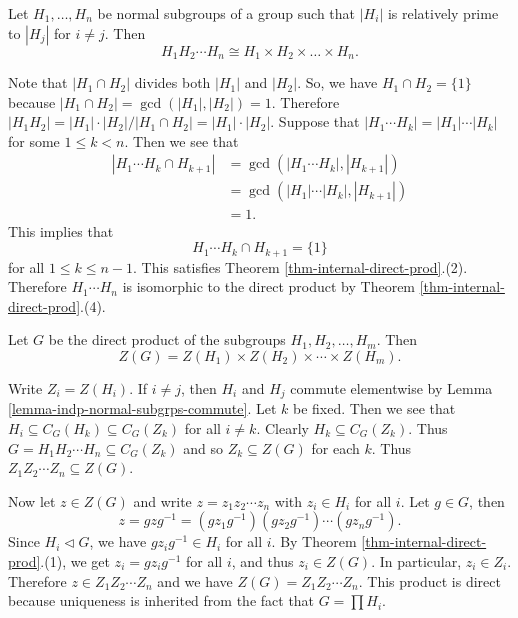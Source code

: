 \begin{corollary} \label{cor-direct-product-isom-to-product-subgrps}
	Let $H_1, \dots, H_n$ be normal subgroups of a group such that $|H_i|$ is relatively prime to $|H_j|$ for $i \neq j$. Then \begin{equation*}
		H_1H_2 \cdots H_n \cong H_1 \times H_2 \times \dots \times H_n.
	\end{equation*} 
\end{corollary}
\begin{sketch}
	Note that $|H_1 \cap H_2|$ divides both $|H_1|$ and $|H_2|$. So, we have $H_1 \cap H_2 = \{1\}$ because $|H_1 \cap H_2| = \gcd(|H_1|, |H_2|) = 1$. Therefore $|H_1 H_2| =|H_1| \cdot |H_2|/|H_1 \cap H_2| =   |H_1| \cdot |H_2|$. Suppose that $|H_1 \cdots H_{k}| = |H_1| \cdots |H_{k}|$ for some $1\leq k< n$. Then we see that 
	\begin{align*}
		|H_1 \cdots H_{k} \cap H_{k+1}| &= \gcd(|H_1 \cdots H_{k}| , |H_{k+1}|) 
		\\
		&= \gcd(|H_1| \cdots |H_{k}| , |H_{k+1}|)
		\\
		&= 1. 
	\end{align*}
	This implies that 
	\begin{equation*}
		H_1 \cdots H_{k} \cap H_{k+1} = \{1\}
	\end{equation*}
	for all $1\leq k\leq n-1$. This satisfies Theorem \ref{thm-internal-direct-prod}.(2). Therefore $H_1 \cdots H_n$ is isomorphic to the direct product by Theorem \ref{thm-internal-direct-prod}.(4).
\end{sketch}
\begin{corollary} \label{cor-center-of-direct-product}
	Let $G$ be the direct product of the subgroups $H_1, H_2, \dots, H_m$. Then 
	\begin{equation*}
		Z(G) = Z(H_1) \times Z(H_2) \times \cdots \times Z(H_m).
	\end{equation*}
\end{corollary}
\begin{sketch}
	
	Write $Z_i = Z(H_i)$. If $i \ne j$, then $H_i$ and $H_j$ commute elementwise by Lemma \ref{lemma-indp-normal-subgrps-commute}. Let $k$ be fixed. Then we see that $H_i \subseteq C_G(H_k) \subseteq C_G(Z_k)$ for all $i\neq k$. Clearly $H_k \subseteq C_G(Z_k)$. Thus
	$G =  H_1H_2\cdots H_n \subseteq C_G(Z_k)$
	and so $Z_k \subseteq Z(G)$ for each $k$. Thus $Z_1Z_2\cdots Z_n \subseteq Z(G)$.
	
	Now let $z \in Z(G)$ and write $z = z_1 z_2 \cdots z_n$ with $z_i \in H_i$ for all $i$. Let $g \in G$, then
	$$z = gzg^{-1} = (gz_1g^{-1})(gz_2g^{-1}) \cdots (gz_ng^{-1}).$$
	Since $H_i\lhd G$, we have $gz_ig^{-1} \in H_i$ for all $i$. By Theorem \ref{thm-internal-direct-prod}.(1), we get  $z_i = gz_ig^{-1}$ for all $i$, and thus $z_i \in Z(G)$. In particular, $z_i \in Z_i$. Therefore $z \in Z_1Z_2\cdots Z_n$ and we have $Z(G) = Z_1Z_2\cdots Z_n$. This product is direct  because uniqueness is inherited from the fact that $G = \prod H_i$.
\end{sketch}
